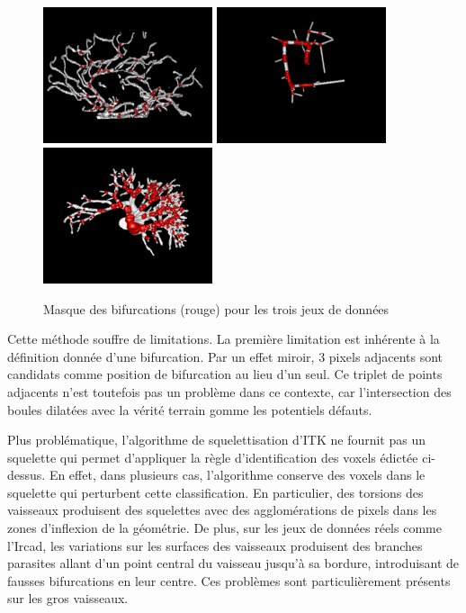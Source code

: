 \begin{figure}[!ht]
  \centering
  \includegraphics[height=4cm]{Images/bifurcations_bullitt.png}
  \includegraphics[height=4cm]{Images/bifurcations_vascu.png}
  \includegraphics[height=4cm]{Images/bifurcations_ircad.png}
  \caption{Masque des bifurcations (rouge) pour les trois jeux de données}
  \label{fig:bifurcations_masks}
\end{figure}

Cette méthode souffre de limitations. La première limitation est inhérente à la définition donnée d'une bifurcation. Par un effet miroir, 3 pixels adjacents sont candidats comme position de bifurcation au lieu d'un seul. Ce triplet de points adjacents n'est toutefois pas un problème dans ce contexte, car l'intersection des boules dilatées avec la vérité terrain gomme les potentiels défauts.

Plus problématique, l'algorithme de squelettisation d'ITK ne fournit pas un squelette qui permet d'appliquer la règle d'identification des voxels édictée ci-dessus. En effet, dans plusieurs cas, l'algorithme conserve des voxels dans le squelette qui perturbent cette classification. En particulier, des torsions des vaisseaux produisent des squelettes avec des agglomérations de pixels dans les zones d'inflexion de la géométrie. De plus, sur les jeux de données réels comme l'Ircad, les variations sur les surfaces des vaisseaux produisent des branches parasites allant d'un point central du vaisseau jusqu'à sa bordure, introduisant de fausses bifurcations en leur centre. Ces problèmes sont particulièrement présents sur les gros vaisseaux.


